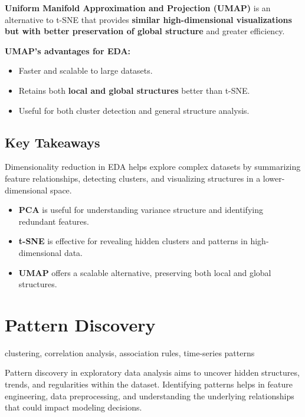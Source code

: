 \documentclass[12pt,openany]{book}
\begin{document}
\textbf{Uniform Manifold Approximation and Projection (UMAP)} is an alternative to t-SNE that provides \textbf{similar high-dimensional visualizations but with better preservation of global structure} and greater efficiency.

\textbf{UMAP’s advantages for EDA:}
\begin{itemize}
    \item Faster and scalable to large datasets.
    \item Retains both \textbf{local and global structures} better than t-SNE.
    \item Useful for both cluster detection and general structure analysis.
\end{itemize}


\subsection{Key Takeaways}

Dimensionality reduction in EDA helps explore complex datasets by summarizing feature relationships, detecting clusters, and visualizing structures in a lower-dimensional space.

\begin{itemize}
    \item \textbf{PCA} is useful for understanding variance structure and identifying redundant features.
    \item \textbf{t-SNE} is effective for revealing hidden clusters and patterns in high-dimensional data.
    \item \textbf{UMAP} offers a scalable alternative, preserving both local and global structures.
\end{itemize}



\section{Pattern Discovery}

\begin{keywordsbox}
clustering, correlation analysis, association rules, time-series patterns
\end{keywordsbox}

Pattern discovery in exploratory data analysis aims to uncover hidden structures, trends, and regularities within the dataset. Identifying patterns helps in feature engineering, data preprocessing, and understanding the underlying relationships that could impact modeling decisions.
\end{document}
